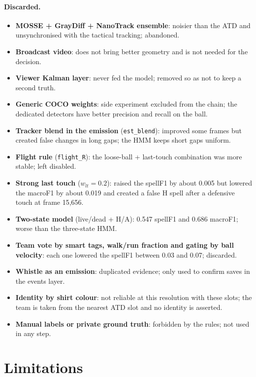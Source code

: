 \documentclass[10pt,a4paper]{article}
\newcommand{\code}[1]{\texttt{\small #1}}
\begin{document}
\paragraph{Discarded.}
\begin{itemize}
\item \textbf{MOSSE + GrayDiff + NanoTrack ensemble}: noisier than the ATD and unsynchronised
with the tactical tracking; abandoned.
\item \textbf{Broadcast video}: does not bring better geometry and is not needed for the
decision.
\item \textbf{Viewer Kalman layer}: never fed the model; removed so as not to keep a second
truth.
\item \textbf{Generic COCO weights}: side experiment excluded from the chain; the dedicated
detectors have better precision and recall on the ball.
\item \textbf{Tracker blend in the emission} (\code{est\_blend}): improved some frames but
created false changes in long gaps; the HMM keeps short gaps uniform.
\item \textbf{Flight rule} (\code{flight\_R}): the loose-ball + last-touch combination was
more stable; left disabled.
\item \textbf{Strong last touch} ($w_{lt}=0.2$): raised the spellF1 by about 0.005 but
lowered the macroF1 by about 0.019 and created a false H spell after a defensive touch at
frame 15,656.
\item \textbf{Two-state model} (live/dead + H/A): 0.547 spellF1 and 0.686 macroF1; worse than
the three-state HMM.
\item \textbf{Team vote by smart tags, walk/run fraction and gating by ball velocity}: each
one lowered the spellF1 between 0.03 and 0.07; discarded.
\item \textbf{Whistle as an emission}: duplicated evidence; only used to confirm saves in the
events layer.
\item \textbf{Identity by shirt colour}: not reliable at this resolution with these slots;
the team is taken from the nearest ATD slot and no identity is asserted.
\item \textbf{Manual labels or private ground truth}: forbidden by the rules; not used in any
step.
\end{itemize}

\section{Limitations}
\end{document}
